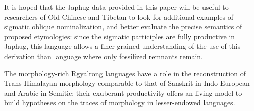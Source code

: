 \documentclass[oneside,a4paper,11pt]{article}
\begin{document}
It is hoped that the Japhug data provided in this paper will be useful to researchers of Old Chinese and Tibetan to look for additional examples of sigmatic oblique nominalization, and better evaluate the precise semantics of proposed etymologies: since the sigmatic participles are fully productive in Japhug, this language allows a finer-grained understanding of the use of this derivation than language where only fossilized remnants remain. 

The morphology-rich Rgyalrong languages have a role in the reconstruction of Trans-Himalayan morphology comparable to that of Sanskrit in Indo-European and Arabic in Semitic: their exuberant productivity offers an living model to build hypotheses on the traces of morphology in lesser-endowed languages.



\end{document}

